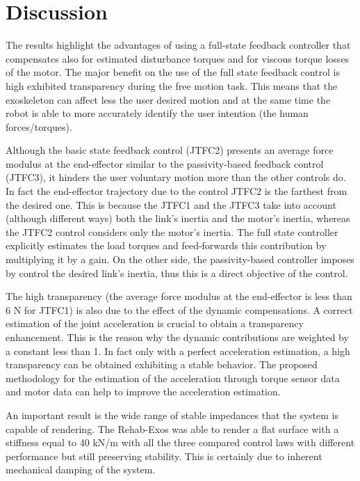 \section{Discussion} \label{sec:discussion}

The results highlight the advantages of using a full-state feedback controller that compensates also for estimated disturbance torques and for viscous torque losses of the motor. The major benefit on the use of the full state feedback control is high exhibited transparency during the free motion task. This means that the exoskeleton can affect less the user desired motion and at the same time the robot is able to more accurately identify the user intention (the human forces/torques).
\par Although the basic state feedback control (JTFC2) presents an average force modulus at the end-effector similar to the passivity-based feedback control (JTFC3), it hinders the user voluntary motion more than the other controls do. In fact the end-effector trajectory due to the control JTFC2 is the farthest from the desired one. This is because the JTFC1 and the JTFC3 take into account (although different ways) both the link's inertia and the motor's inertia, whereas the JTFC2 control considers only the motor's inertia. The full state controller explicitly estimates the load torques and feed-forwards this contribution by multiplying it by a gain. On the other side, the passivity-based controller imposes by control the desired link's inertia, thus this is a direct objective of the control.
\par The high transparency (the average force modulus at the end-effector is less than 6 N for JTFC1) is also due to the effect of the dynamic compensations. A correct estimation of the joint acceleration is crucial to obtain a transparency enhancement. This is the reason why the dynamic contributions are weighted by a constant less than 1. In fact only with a perfect acceleration estimation, a high transparency can be obtained  exhibiting a stable behavior. The proposed methodology for the estimation of the acceleration through torque sensor data and motor data can help to improve the acceleration estimation.
\par An important result is the wide range of stable impedances that the system is capable of rendering. The Rehab-Exos was able to render a flat surface with a stiffness equal to 40 kN/m with all the three compared control laws with different performance but still preserving stability. This is certainly due to inherent mechanical damping of the system.

